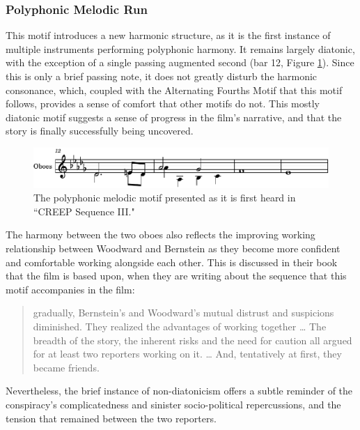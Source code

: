 \subsubsection{Polyphonic Melodic Run
}
This motif introduces a new harmonic structure, as it is the first instance of multiple instruments performing polyphonic harmony.
It remains largely diatonic, with the exception of a single passing augmented second (bar 12, Figure \ref{fig:president-intertwining}).
Since this is only a brief passing note, it does not greatly disturb the harmonic consonance, which, coupled with the Alternating Fourths Motif that this motif follows, provides a sense of comfort that other motifs do not.
This mostly diatonic motif suggests a sense of progress in the film's narrative, and that the story is finally successfully being uncovered.

\begin{figure}
    \centering
    \includegraphics[width=1\linewidth]{img/president-intertwining.pdf}
    \caption{The polyphonic melodic motif presented as it is first heard in ``CREEP Sequence III."}
    \label{fig:president-intertwining}
\end{figure}

The harmony between the two oboes also reflects the improving working relationship between Woodward and Bernstein as they become more confident and comfortable working alongside each other.
This is discussed in their book that the film is based upon, when they are writing about the sequence that this motif accompanies in the film:
\begin{quote}
gradually, Bernstein’s and Woodward’s mutual distrust and suspicions diminished. They realized the advantages of working together … The breadth of the story, the inherent risks and the need for caution all argued for at least two reporters working on it. … And, tentatively at first, they became friends.\autocites[While the book was written by the two reporters, it is written in the third person.][49-51]{woodward_all_1974}
\end{quote}
Nevertheless, the brief instance of non-diatonicism offers a subtle reminder of the conspiracy's complicatedness and sinister socio-political repercussions, and the tension that remained between the two reporters.





